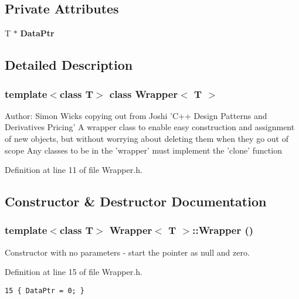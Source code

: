 \subsection*{Private Attributes}
\begin{CompactItemize}
\item 
T $\ast$ {\bf DataPtr}
\end{CompactItemize}


\subsection{Detailed Description}
\subsubsection*{template$<$class T$>$ class Wrapper$<$ T $>$}

\begin{Desc}
\item[Author:]Simon Wicks copying out from Joshi 'C++ Design Patterns and Derivatives Pricing' A wrapper class to enable easy construction and assignment of new objects, but without worrying about deleting them when they go out of scope Any classes to be in the 'wrapper' must implement the 'clone' function \end{Desc}


Definition at line 11 of file Wrapper.h.

\subsection{Constructor \& Destructor Documentation}
\subsubsection{\setlength{\rightskip}{0pt plus 5cm}template$<$class T$>$ {\bf Wrapper}$<$ T $>$::{\bf Wrapper} ()\hspace{0.3cm}{\tt  [inline]}}\label{classWrapper_747788c9b29a997f4d805ec60e6e16a2}


Constructor with no parameters - start the pointer as null and zero. 



Definition at line 15 of file Wrapper.h.

\begin{Code}\begin{verbatim}15 { DataPtr = 0; }
\end{verbatim}
\end{Code}


